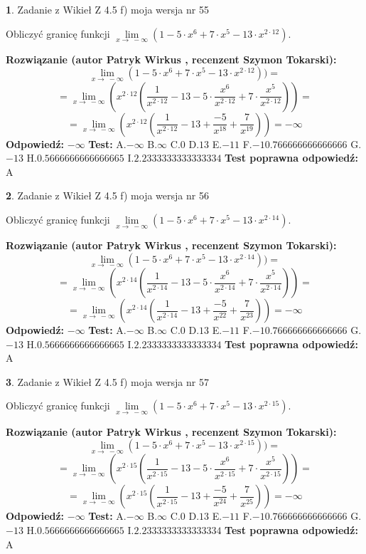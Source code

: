 \documentclass[12pt, a4paper]{article}
\theoremstyle{definition} %
\newtheorem{zad}{}
\newcommand{\zadStart}[1]{\begin{zad}#1\newline}
\newcommand{\zadStop}{\end{zad}}
\newcommand{\rozwStart}[2]{\noindent \textbf{Rozwiązanie (autor #1 , recenzent #2): }\newline}
\newcommand{\rozwStop}{\newline}
\newcommand{\odpStart}{\noindent \textbf{Odpowiedź:}\newline}
\newcommand{\odpStop}{\newline}
\newcommand{\testStart}{\noindent \textbf{Test:}\newline}
\newcommand{\testStop}{\newline}
\newcommand{\kluczStart}{\noindent \textbf{Test poprawna odpowiedź:}\newline}
\newcommand{\kluczStop}{\newline}
\begin{document}
\zadStart{Zadanie z Wikieł Z 4.5 f) moja wersja nr 55}


Obliczyć granicę funkcji  $\lim\limits_{x\to\ -\infty}(1 - 5 \cdot x^{6}+7 \cdot x^{5}- 13 \cdot x^{2\cdot12})$.
\zadStop
\rozwStart{Patryk Wirkus}{Szymon Tokarski}
$$\lim\limits_{x\to\ -\infty}(1 - 5 \cdot x^{6}+7 \cdot x^{5}- 13 \cdot x^{2\cdot12}))=$$
$$=\lim\limits_{x\to\ -\infty}(x^{2\cdot12}(\frac{1}{x^{2\cdot12}}-13 -5 \cdot \frac{x^{6}}{x^{2\cdot12}}+7 \cdot \frac{x^{5}}{x^{2\cdot12}}))=$$
$$=\lim\limits_{x\to\ -\infty}(x^{2\cdot12}(\frac{1}{x^{2\cdot12}}-13 + \frac{-5}{x^{18}}+ \frac{7}{x^{19}}))=-\infty$$
\rozwStop
\odpStart
$-\infty$
\odpStop
\testStart
A.$-\infty$ B.$\infty$ C.$0$ D.$13$ E.$-11$
F.$-10.766666666666666$ G.$-13$
H.$0.5666666666666665$
I.$2.2333333333333334$
\testStop
\kluczStart
A
\kluczStop



\zadStart{Zadanie z Wikieł Z 4.5 f) moja wersja nr 56}


Obliczyć granicę funkcji  $\lim\limits_{x\to\ -\infty}(1 - 5 \cdot x^{6}+7 \cdot x^{5}- 13 \cdot x^{2\cdot14})$.
\zadStop
\rozwStart{Patryk Wirkus}{Szymon Tokarski}
$$\lim\limits_{x\to\ -\infty}(1 - 5 \cdot x^{6}+7 \cdot x^{5}- 13 \cdot x^{2\cdot14}))=$$
$$=\lim\limits_{x\to\ -\infty}(x^{2\cdot14}(\frac{1}{x^{2\cdot14}}-13 -5 \cdot \frac{x^{6}}{x^{2\cdot14}}+7 \cdot \frac{x^{5}}{x^{2\cdot14}}))=$$
$$=\lim\limits_{x\to\ -\infty}(x^{2\cdot14}(\frac{1}{x^{2\cdot14}}-13 + \frac{-5}{x^{22}}+ \frac{7}{x^{23}}))=-\infty$$
\rozwStop
\odpStart
$-\infty$
\odpStop
\testStart
A.$-\infty$ B.$\infty$ C.$0$ D.$13$ E.$-11$
F.$-10.766666666666666$ G.$-13$
H.$0.5666666666666665$
I.$2.2333333333333334$
\testStop
\kluczStart
A
\kluczStop



\zadStart{Zadanie z Wikieł Z 4.5 f) moja wersja nr 57}


Obliczyć granicę funkcji  $\lim\limits_{x\to\ -\infty}(1 - 5 \cdot x^{6}+7 \cdot x^{5}- 13 \cdot x^{2\cdot15})$.
\zadStop
\rozwStart{Patryk Wirkus}{Szymon Tokarski}
$$\lim\limits_{x\to\ -\infty}(1 - 5 \cdot x^{6}+7 \cdot x^{5}- 13 \cdot x^{2\cdot15}))=$$
$$=\lim\limits_{x\to\ -\infty}(x^{2\cdot15}(\frac{1}{x^{2\cdot15}}-13 -5 \cdot \frac{x^{6}}{x^{2\cdot15}}+7 \cdot \frac{x^{5}}{x^{2\cdot15}}))=$$
$$=\lim\limits_{x\to\ -\infty}(x^{2\cdot15}(\frac{1}{x^{2\cdot15}}-13 + \frac{-5}{x^{24}}+ \frac{7}{x^{25}}))=-\infty$$
\rozwStop
\odpStart
$-\infty$
\odpStop
\testStart
A.$-\infty$ B.$\infty$ C.$0$ D.$13$ E.$-11$
F.$-10.766666666666666$ G.$-13$
H.$0.5666666666666665$
I.$2.2333333333333334$
\testStop
\kluczStart
A
\kluczStop
\end{document}
